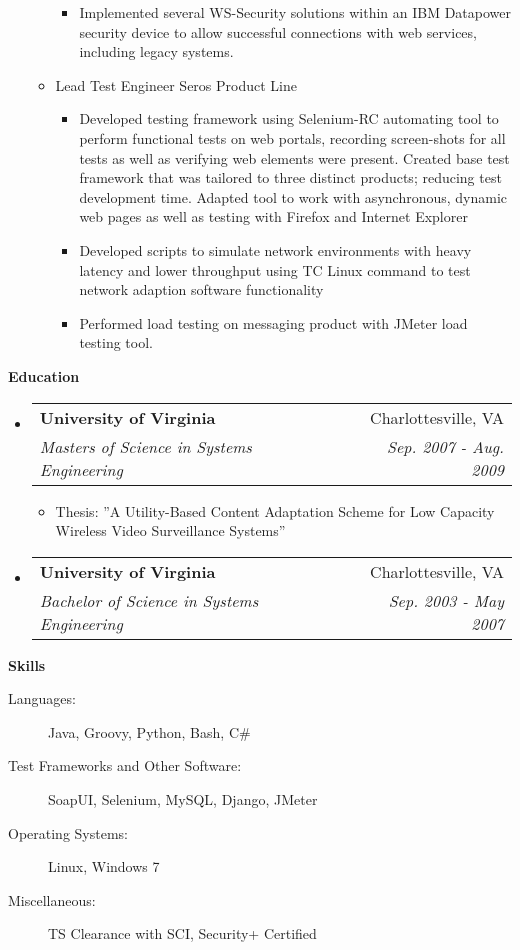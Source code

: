 \documentclass[letterpaper,10pt]{article}
\makeatletter
\newcommand{\resitem}[1]{\item #1 \vspace{-2pt}}
\newcommand{\resheading}[1]{{\large \colorbox{mygrey}{\begin{minipage}{\textwidth}{\textbf{#1 \vphantom{p\^{E}}}}\end{minipage}}}}
\newcommand{\ressubheading}[4]{
\begin{tabular*}{7.0in}{l@{\extracolsep{\fill}}r}
		\textbf{#1} & #2 \\
		\textit{#3} & \textit{#4} \\
\end{tabular*}\vspace{-6pt}}
\makeatother
\begin{document}
\begin{itemize}
\begin{itemize}
\begin{itemize}
		  			\item{Implemented several WS-Security solutions within an IBM Datapower security device to allow successful connections with web services, including legacy systems.}
		  		\end{itemize}
		\resitem{Lead Test Engineer Seros Product Line}
		  \begin{itemize}
		    \item{Developed testing framework using Selenium-RC automating tool to perform functional tests  on web portals, recording screen-shots for all tests as well as verifying web elements were present.  Created base test framework that was tailored to three distinct products; reducing test development time. Adapted tool to work with asynchronous, dynamic web pages as well as testing with Firefox and Internet Explorer}
		    \item{Developed scripts to simulate network environments with heavy latency and lower throughput using TC Linux command to test network adaption software functionality}
		    \item{Performed load testing on messaging product with JMeter load testing tool.}
		  \end{itemize}
	\end{itemize}

\end{itemize}


\resheading{Education}
\begin{itemize}
\item
	\ressubheading{University of Virginia}{Charlottesville, VA}{Masters of Science in Systems Engineering}{Sep. 2007 - Aug. 2009}
	\begin{itemize}
	    \resitem{Thesis: ''A Utility-Based Content Adaptation Scheme for Low Capacity Wireless Video Surveillance Systems''}
	\end{itemize}
\item
	\ressubheading{University of Virginia}{Charlottesville, VA}{Bachelor of Science in Systems Engineering}{Sep. 2003 - May 2007}
	

\end{itemize}


\resheading{Skills}

\begin{description}
\item[Languages:]
Java, Groovy, Python, Bash, C\#
\item[Test Frameworks and Other Software:]
SoapUI, Selenium, MySQL, Django, JMeter
\item[Operating Systems:]
Linux, Windows 7 
\item[Miscellaneous:]
TS Clearance with SCI, Security+ Certified
\end{description}
\end{document}

